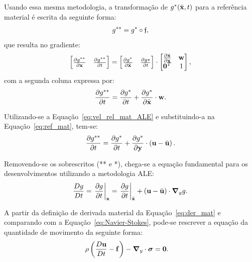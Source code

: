 Usando essa mesma metodologia, a transformação de $g^{*}(\bar{\mathbf{x}},t)$ para a referência material é escrita da seguinte forma:
\begin{align}
	g^{**} = g^{*}  \circ \mathfrak{f},
\end{align}
\noindent que resulta no gradiente:
\begin{align}
	\begin{bmatrix}
		\frac{\partial {g^{**}}}{\partial {\mathbf{x}}} & \frac{\partial {g^{**}}}{\partial t} \\
	\end{bmatrix}
	=
	\begin{bmatrix}
		\frac{\partial {g^*}}{\partial \bar{\mathbf{x}}} & \frac{\partial {g*}}{\partial t} 
	\end{bmatrix}
	\cdot
	\begin{bmatrix}
		\frac{\partial {\bar{\mathbf{x}}}}{\partial {\mathbf{x}}} & \mathbf{w} \\
		\mathbf{0}^T & 1 \\
	\end{bmatrix},
\end{align}
\noindent com a segunda coluna expressa por:
\begin{align}
	\frac{\partial g^{**}}{\partial t} = \frac{\partial g^*}{\partial t} + \frac{\partial g^*}{\partial \bar{\mathbf{x}}} \cdot \mathbf{w}. \label{eq:ref_mat}
\end{align}

Utilizando-se a Equação~\eqref{eq:vel_rel_mat_ALE} e substituindo-a na Equação~\eqref{eq:ref_mat}, tem-se:
\begin{align}
	\frac{\partial g^{**}}{\partial t} = \frac{\partial g^*}{\partial t} + \frac{\partial g^*}{\partial \mathbf{y}} \cdot \left(\mathbf{u} - \bar{\mathbf{u}} \right). 
\end{align}

Removendo-se os sobrescritos (** e *), chega-se a equação fundamental para os desenvolvimentos utilizando a metodologia ALE:
\begin{align}
	\frac{Dg}{Dt} = \left . \frac{\partial g}{\partial t} \right|_{\mathbf{x}} = \left . \frac{\partial g}{\partial t} \right|_{\bar{\mathbf{x}}} + \left(\mathbf{u} - \bar{\mathbf{u}} \right) \cdot \boldsymbol{\nabla}_y g. \label{eq:der_mat_ALE}
\end{align}

A partir da definição de derivada material da Equação~\eqref{eq:der_mat} e comparando com a Equação~\eqref{eq:Navier-Stokes}, pode-se rescrever a equação da quantidade de movimento da seguinte forma:
\begin{align}
	\rho\left(\frac{D\mathbf{u}}{Dt} - \mathbf{f} \right) - \boldsymbol{\nabla}_y \cdot \boldsymbol{\sigma} &= \mathbf{0}. \label{eq:Navier-Stokes_der_mat_Euleriana}
\end{align}

